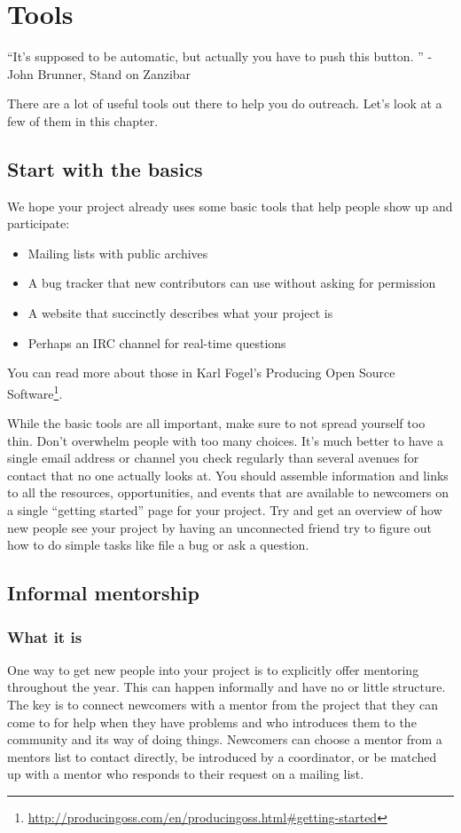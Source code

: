 \chapter{Tools}
“It's supposed to be automatic, but actually you have to push this button. ” - John Brunner, Stand on Zanzibar

There are a lot of useful tools out there to help you do outreach. Let’s look at a few of them in this chapter. 

\section{Start with the basics}
We hope your project already uses some basic tools that help people show up and participate:
\begin{itemize}
 \item Mailing lists with public archives
 \item A bug tracker that new contributors can use without asking for permission
 \item A website that succinctly describes what your project is
 \item Perhaps an IRC channel for real-time questions
\end{itemize}

You can read more about those in Karl Fogel’s Producing Open Source Software\footnote{\url{http://producingoss.com/en/producingoss.html\#getting-started}}.

While the basic tools are all important, make sure to not spread yourself too thin. Don’t overwhelm people with too many choices. It’s much better to have a single email address or channel you check regularly than several avenues for contact that no one actually looks at. You should assemble information and links to all the resources, opportunities, and events that are available to newcomers on a single “getting started” page for your project. Try and get an overview of how new people see your project by having an unconnected friend try to figure out how to do simple tasks like file a bug or ask a question.

\section{Informal mentorship}
\subsection{What it is}
One way to get new people into your project is to explicitly offer mentoring throughout the year. This can happen informally and have no or little structure. The key is to connect newcomers with a mentor from the project that they can come to for help when they have problems and who introduces them to the community and its way of doing things. Newcomers can choose a mentor from a mentors list to contact directly, be introduced by a coordinator, or be matched up with a mentor who responds to their request on a mailing list.

